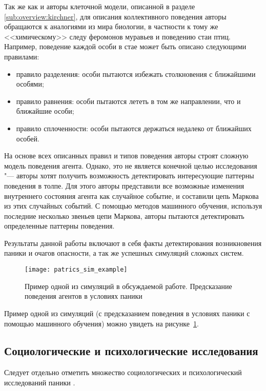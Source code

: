 Так же как и авторы клеточной модели, описанной в разделе \ref{sub:overview:kirchner}, для описания коллективного поведения авторы обращаются к аналогиями из мира биологии,
в частности к тому же <<химическому>> следу феромонов муравьев и поведению стаи птиц.
Например, поведение каждой особи в стае может быть описано следующими правилами:

\begin{itemize}
  \item правило разделения: особи пытаются избежать столкновения с ближайшими особями;
  \item правило равнения: особи пытаются лететь в том же направлении, что и ближайшие особи;
  \item правило сплоченности: особи пытаются держаться недалеко от ближайших особей.
\end{itemize}

На основе всех описанных правил и типов поведения авторы строят сложную модель поведения агента.
Однако, это не является конечной целью исследования "--- авторы хотят получить возможность детектировать интересующие паттерны поведения в толпе.
Для этого авторы представили все возможные изменения внутреннего состояния агента как случайное событие, и составили цепь Маркова из этих случайных событий.
С помощью методов машинного обучения, используя последние несколько звеньев цепи Маркова, авторы пытаются детектировать определенные паттерны поведения.

Результаты данной работы включают в себя факты детектирования возникновения паники и очагов опасности, а так же успешных симуляций сложных систем.

\begin{figure}[ht!]
  \centering
  \texttt{[image: patrics\_sim\_example]}
  \caption{Пример одной из симуляций в обсуждаемой работе. Предсказание поведения агентов в условиях паники}
  \label{sub:overview:patrics:sim_example}
\end{figure}

Пример одной из симуляций (с предсказанием поведения в условиях паники с помощью машинного обучения) можно увидеть на рисунке~\ref{sub:overview:patrics:sim_example}.


\subsection{Социологические и психологические исследования}
\label{sub:overview:soc}

Следует отдельно отметить множество социологических и психологический исследований паники \cite{guten1972likelihood} \cite{mawson2005understanding} \cite{quarantelli1975panic} \cite{quarantelli1999sociology} \cite{quarantelli2001sociology} \cite{quarantelli1979panic} \cite{robinette2011incorporating}.

